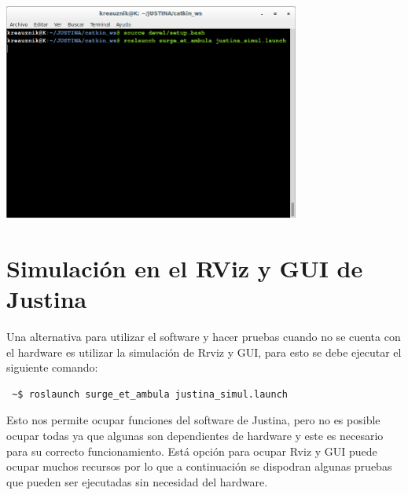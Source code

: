 \documentclass[user_manual.tex]{subfiles}
\begin{document}
 \begin{center}
\includegraphics[width=0.73\textwidth]{Figures/PP/pp6.png}
\end{center}
\section{Simulación en el RViz y GUI de Justina}
Una alternativa para utilizar el software y hacer pruebas cuando no se cuenta con el hardware es utilizar la simulación de Rrviz y GUI, para esto se debe ejecutar el siguiente comando:\\

\begin{verbatim}
 ~$ roslaunch surge_et_ambula justina_simul.launch
\end{verbatim}

Esto nos permite ocupar funciones del software de Justina, pero no es posible ocupar todas ya que algunas son dependientes de hardware y este es necesario para su correcto funcionamiento. Está opción para ocupar Rviz y GUI puede ocupar muchos recursos por lo que a continuación se dispodran algunas pruebas que pueden ser ejecutadas sin necesidad del hardware.
\end{document}
